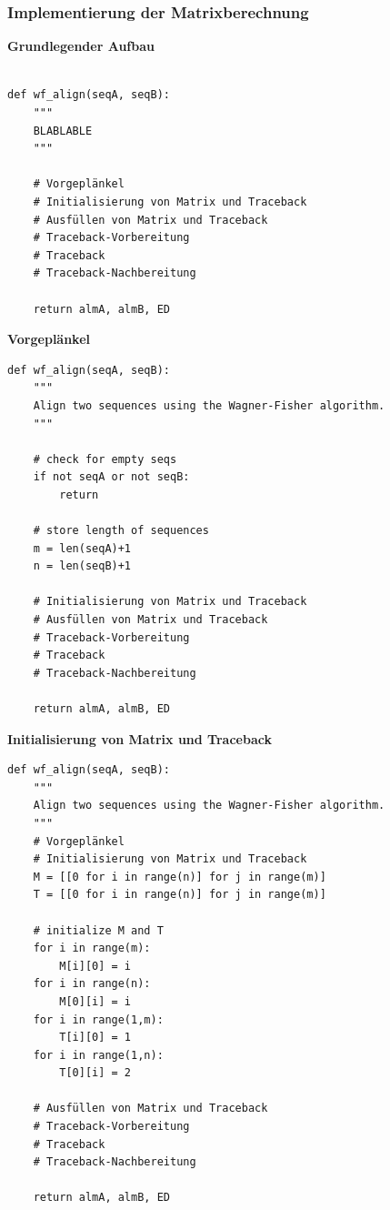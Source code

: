 \subsubsection{Implementierung der Matrixberechnung}

\par\noindent\textbf{Grundlegender Aufbau}

\begin{verbatim}

def wf_align(seqA, seqB):
    """
    BLABLABLE
    """

    # Vorgeplänkel
    # Initialisierung von Matrix und Traceback
    # Ausfüllen von Matrix und Traceback
    # Traceback-Vorbereitung
    # Traceback
    # Traceback-Nachbereitung

    return almA, almB, ED
\end{verbatim}





\par\noindent\textbf{Vorgeplänkel}

\begin{verbatim}
def wf_align(seqA, seqB):
    """
    Align two sequences using the Wagner-Fisher algorithm.
    """

    # check for empty seqs
    if not seqA or not seqB:
        return

    # store length of sequences
    m = len(seqA)+1
    n = len(seqB)+1

    # Initialisierung von Matrix und Traceback
    # Ausfüllen von Matrix und Traceback
    # Traceback-Vorbereitung
    # Traceback
    # Traceback-Nachbereitung

    return almA, almB, ED
\end{verbatim}





\par\noindent\textbf{Initialisierung von Matrix und Traceback}

\begin{verbatim}
def wf_align(seqA, seqB):
    """
    Align two sequences using the Wagner-Fisher algorithm.
    """
    # Vorgeplänkel
    # Initialisierung von Matrix und Traceback
    M = [[0 for i in range(n)] for j in range(m)]
    T = [[0 for i in range(n)] for j in range(m)]

    # initialize M and T
    for i in range(m): 
        M[i][0] = i
    for i in range(n):
        M[0][i] = i
    for i in range(1,m):
        T[i][0] = 1
    for i in range(1,n):
        T[0][i] = 2

    # Ausfüllen von Matrix und Traceback
    # Traceback-Vorbereitung
    # Traceback
    # Traceback-Nachbereitung

    return almA, almB, ED
\end{verbatim}





